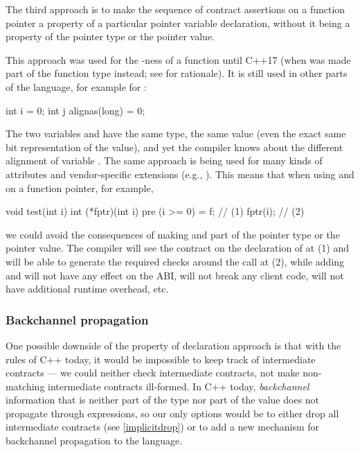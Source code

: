 The third approach is to make the sequence of contract assertions on a function pointer a property of a particular pointer variable declaration, without it being a property of the pointer type or the pointer value.

This approach was used for the -ness of a function until C++17 (when  was made part of the function type instead; see \cite{P0012R1} for rationale). It is still used in other parts of the language, for example for :
\begin{codeblock}
int i = 0;
int j alignas(long) = 0;
\end{codeblock}
The two variables  and  have the same type, the same value (even the exact same bit representation of the value), and yet the compiler knows about the different alignment of variable . The same approach is being used for many kinds of attributes and vendor-specific extensions (e.g., ). This means that when using   and  on a function pointer, for example,
\begin{codeblock}
void test(int i) {
  int (*fptr)(int i) pre (i >= 0) = f;  // (1)
  fptr(i);  // (2)
}
\end{codeblock}
we could avoid the consequences of making   and  part of the pointer type or the pointer value. The compiler will see the contract on the declaration of  at (1) and will be able to generate the required checks around the call at (2), while adding  and  will not have any effect on the ABI, will not break any client code, will not have additional runtime overhead, etc.

\subsubsection{Backchannel propagation}

One possible downside of the property of declaration approach is that with the rules of C++ today, it would be impossible to keep track of intermediate contracts --- we could neither check intermediate contracts, not make non-matching intermediate contracts ill-formed. In C++ today, \emph{backchannel} information that is neither part of the type nor part of the value does not propagate through expressions, so our only options would be to either drop all intermediate contracts (see \ref{implicitdrop}) or to add a new mechanism for backchannel propagation to the language.

